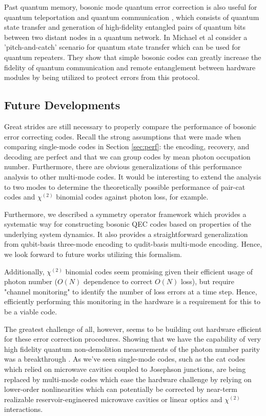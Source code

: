 \documentclass[12]{amsart}
\newcommand\0{\mathbf{0}}
\newcommand\<{\langle}
\renewcommand\>{\rangle}
\begin{document}
Past quantum memory, bosonic mode quantum error correction is also useful for quantum teleportation and quantum communication \cite{michael2016new}, which consists of quantum state transfer and generation of high-fidelity entangled pairs of quantum bits between two distant nodes in a quantum network. In \cite{michael2016new} Michael et al consider a 'pitch-and-catch' scenario for quantum state transfer which can be used for quantum repeaters. They show that simple bosonic codes can greatly increase the fidelity of quantum communication and remote entanglement between hardware modules by being utilized to protect errors from this protocol.

\subsection{Future Developments}

Great strides are still necessary to properly compare the performance of bosonic error correcting codes. Recall the strong assumptions that were made when comparing single-mode codes in Section \ref{sec:perf}: the encoding, recovery, and decoding are perfect and that we can group codes by mean photon occupation number. Furthermore, there are obvious generalizations of this performance analysis to other multi-mode codes. It would be interesting to extend the analysis to two modes to determine the theoretically possible performance of pair-cat codes and $\chi^{(2)}$ binomial codes against photon loss, for example.

Furthermore, we described a symmetry operator framework which provides a systematic way for constructing bosonic QEC codes based on properties of the underlying system dynamics. It also provides a straightforward generalization from qubit-basis three-mode encoding to qudit-basis multi-mode encoding. Hence, we look forward to future works utilizing this formalism.

Additionally, $\chi^{(2)}$ binomial codes seem promising given their efficient usage of photon number ($O(N)$ dependence to correct $O(N)$ loss), but require "channel monitoring" to identify the number of loss errors at a time step. Hence, efficiently performing this monitoring in the hardware is a requirement for this to be a viable code.

The greatest challenge of all, however, seems to be building out hardware efficient for these error correction procedures. Showing that we have the capability of very high fidelity quantum non-demolition measurements of the photon number parity was a breakthrough \cite{sun2014tracking}. As we've seen single-mode codes, such as the cat codes which relied on microwave cavities coupled to Josephson junctions, are being replaced by multi-mode codes which ease the hardware challenge by relying on lower-order nonlinearities which can potentially be corrected by near-term realizable reservoir-engineered microwave cavities \cite{albert2018multimode} or linear optics and $\chi^{(2)}$ interactions.

\nocite{*}


\end{document}
